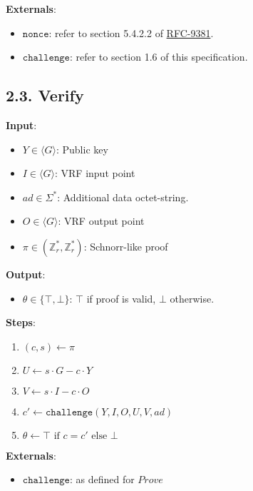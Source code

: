 \documentclass[
]{article}
\providecommand{\tightlist}{%
  \setlength{\itemsep}{0pt}\setlength{\parskip}{0pt}}
\begin{document}
\textbf{Externals}:

\begin{itemize}
\tightlist
\item
  \(\texttt{nonce}\): refer to section 5.4.2.2 of
  \href{https://datatracker.ietf.org/doc/rfc9381}{RFC-9381}.
\item
  \(\texttt{challenge}\): refer to section 1.6 of this specification.
\end{itemize}

\hypertarget{verify}{%
\subsection{2.3. Verify}\label{verify}}

\textbf{Input}:

\begin{itemize}
\tightlist
\item
  \(Y \in \langle G \rangle\): Public key
\item
  \(I \in \langle G \rangle\): VRF input point
\item
  \(ad \in \Sigma^*\): Additional data octet-string.
\item
  \(O \in \langle G \rangle\): VRF output point
\item
  \(\pi \in (\mathbb{Z}^*_r, \mathbb{Z}^*_r)\): Schnorr-like proof
\end{itemize}

\textbf{Output}:

\begin{itemize}
\tightlist
\item
  \(\theta \in \{ \top, \bot \}\): \(\top\) if proof is valid, \(\bot\)
  otherwise.
\end{itemize}

\textbf{Steps}:

\begin{enumerate}
\def\labelenumi{\arabic{enumi}.}
\tightlist
\item
  \((c, s) \gets \pi\)
\item
  \(U \gets s \cdot G - c \cdot Y\)
\item
  \(V \gets s \cdot I - c \cdot O\)
\item
  \(c' \gets \texttt{challenge}(Y, I, O, U, V, ad)\)
\item
  \(\theta \gets \top \text{ if } c = c' \text{ else } \bot\)
\end{enumerate}

\textbf{Externals}:

\begin{itemize}
\tightlist
\item
  \(\texttt{challenge}\): as defined for \(Prove\)
\end{itemize}
\end{document}

